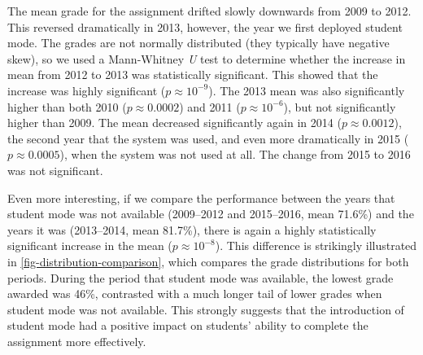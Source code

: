 \documentclass[sigconf, authordraft, capitalise]{acmart}
\begin{document}
The mean grade for the assignment drifted slowly downwards from 2009 to 2012. This reversed dramatically in 2013, however, the year we first deployed student mode. The grades are not normally distributed (they typically have negative skew), so we used a Mann-Whitney \emph{U} test to determine whether the increase in mean from 2012 to 2013 was statistically significant. This showed that the increase was highly significant (\(p \approx 10^{-9}\)). The 2013 mean was also significantly higher than both 2010 (\(p \approx 0.0002\)) and 2011 (\(p \approx 10^{-6}\)), but not significantly higher than 2009. The mean decreased significantly again in 2014 (\(p \approx 0.0012\)), the second year that the system was used, and even more dramatically in 2015 (\(p \approx 0.0005\)), when the system was not used at all. The change from 2015 to 2016 was not significant.

Even more interesting, if we compare the performance between the years that student mode was not available (2009--2012 and 2015--2016, mean 71.6\%) and the years it was (2013--2014, mean 81.7\%), there is again a highly statistically significant increase in the mean (\(p \approx 10^{-8}\)). This difference is strikingly illustrated in \cref{fig-distribution-comparison}, which compares the grade distributions for both periods. During the period that student mode was available, the lowest grade awarded was 46\%, contrasted with a much longer tail of lower grades when student mode was not available. This strongly suggests that the introduction of student mode had a positive impact on students' ability to complete the assignment more effectively.
\end{document}
